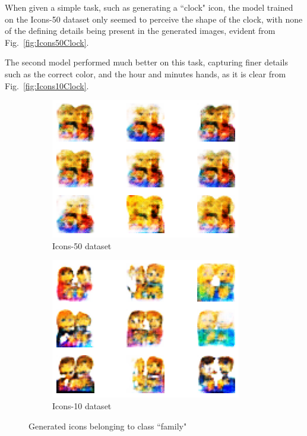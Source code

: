 \documentclass[conference]{IEEEtran}
\begin{document}
When given a simple task, such as generating a ``clock" icon, the model trained on the Icons-50 dataset only seemed to perceive the shape of the clock, with none of the defining details being present in the generated images, evident from Fig.~\ref{fig:Icons50Clock}.

The second model performed much better on this task, capturing finer details such as the correct color, and the hour and minutes hands, as it is clear from Fig.~\ref{fig:Icons10Clock}.

\begin{figure}[htbp]
    \begin{subfigure}[h]{0.4\linewidth}
        \includegraphics[width=\linewidth]{paper/images/gen_icons/icons50_family.png}
        \caption{Icons-50 dataset}
        \label{fig:Icons50Family}
    \end{subfigure}
    \hfill
    \begin{subfigure}[h]{0.4\linewidth}
        \includegraphics[width=\linewidth]{paper/images/gen_icons/icons10_family.png}
        \caption{Icons-10 dataset}
        \label{fig:Icons10Family}
    \end{subfigure}
    \caption{Generated icons belonging to class ``family"}
    \label{fig:FamilyIcons}
\end{figure}
\end{document}
